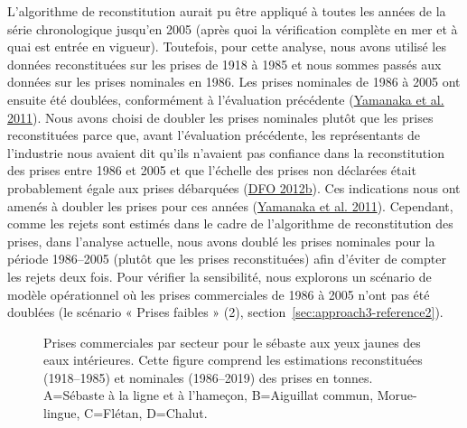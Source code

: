 \documentclass[french,11pt]{book}
\begin{document}
L'algorithme de reconstitution aurait pu être appliqué à toutes les années de la série chronologique jusqu'en 2005 (après quoi la vérification complète en mer et à quai est entrée en vigueur). Toutefois, pour cette analyse, nous avons utilisé les données reconstituées sur les prises de 1918 à 1985 et nous sommes passés aux données sur les prises nominales en 1986. Les prises nominales de 1986 à 2005 ont ensuite été doublées, conformément à l'évaluation précédente (\protect\hyperlink{ref-yamanaka2011}{Yamanaka et al. 2011}). Nous avons choisi de doubler les prises nominales plutôt que les prises reconstituées parce que, avant l'évaluation précédente, les représentants de l'industrie nous avaient dit qu'ils n'avaient pas confiance dans la reconstitution des prises entre 1986 et 2005 et que l'échelle des prises non déclarées était probablement égale aux prises débarquées (\protect\hyperlink{ref-dfo2012b}{DFO 2012b}). Ces indications nous ont amenés à doubler les prises pour ces années (\protect\hyperlink{ref-yamanaka2011}{Yamanaka et al. 2011}). Cependant, comme les rejets sont estimés dans le cadre de l'algorithme de reconstitution des prises, dans l'analyse actuelle, nous avons doublé les prises nominales pour la période 1986--2005 (plutôt que les prises reconstituées) afin d'éviter de compter les rejets deux fois. Pour vérifier la sensibilité, nous explorons un scénario de modèle opérationnel où les prises commerciales de 1986 à 2005 n'ont pas été doublées (le scénario « Prises faibles » (2), section~\ref{sec:approach3-reference2}).
\begin{figure}[htb]

{\centering {} 

}

\caption{Prises commerciales par secteur pour le sébaste aux yeux jaunes des eaux intérieures. Cette figure comprend les estimations reconstituées (1918--1985) et nominales (1986--2019) des prises en tonnes. A=Sébaste à la ligne et à l’hameçon, B=Aiguillat commun, Morue-lingue, C=Flétan, D=Chalut.}\label{fig:commcatch2}
\end{figure}
\clearpage
\end{document}

